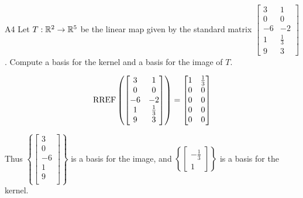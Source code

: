 \begin{problem}{A4}
Let $T: \mathbb{R}^2 \rightarrow \mathbb{R}^5$ be the linear map given by the standard matrix
\(
  \begin{bmatrix}
    3 & 1 \\
    0 & 0 \\
    -6 & -2 \\
    1 & \frac{1}{3} \\
    9 & 3
  \end{bmatrix}
\). Compute a basis for the kernel and a basis for the image of $T$.
\end{problem}
\begin{solution}
\[
  \operatorname{RREF} \left(\begin{bmatrix}
    3 & 1 \\
    0 & 0 \\
    -6 & -2 \\
    1 & \frac{1}{3} \\
    9 & 3
  \end{bmatrix} \right) = \begin{bmatrix}
    1 & \frac{1}{3} \\
    0 & 0 \\
    0 & 0 \\
    0 & 0 \\
    0 & 0
  \end{bmatrix}
\]

Thus \(\left\{
\begin{bmatrix}
  3  \\
  0  \\
  -6 \\
  1 \\
  9 \\
\end{bmatrix}
\right\} \) is a basis for the image, and \(\left\{
  \begin{bmatrix} -\frac{1}{3} \\ 1\end{bmatrix}
\right\} \) is a basis for the kernel.
\end{solution}


